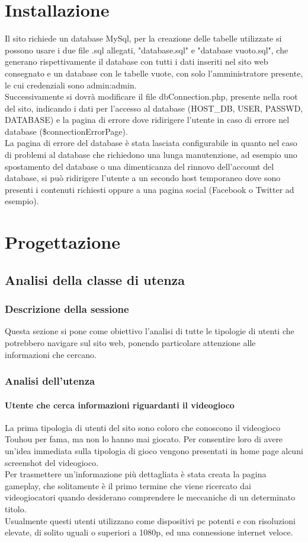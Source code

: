 \documentclass[openany, a4paper, 12pt]{report}
\begin{document}
	\chapter{Installazione}
	Il sito richiede un database MySql, per la creazione delle tabelle utilizzate si possono usare i due file .sql allegati, "database.sql" e "database vuoto.sql", che generano rispettivamente il database con tutti i dati inseriti nel sito web consegnato e un database con le tabelle vuote, con solo l'amministratore presente, le cui credenziali sono admin:admin.\\
	Successivamente si dovrà modificare il file dbConnection.php, presente nella root del sito, indicando i dati per l'accesso al database (HOST\_DB, USER, PASSWD, DATABASE) e la pagina di errore dove ridirigere l'utente in caso di errore nel database  (\$connectionErrorPage).\\
	La pagina di errore del database è stata lasciata configurabile in quanto nel caso di problemi al database che richiedono una lunga manutenzione, ad esempio uno spostamento del database o una dimenticanza del rinnovo dell'account del database, si può ridirigere l'utente a un secondo host temporaneo dove sono presenti i contenuti richiesti oppure a una pagina social (Facebook o Twitter ad esempio).

	\chapter{Progettazione}

	\section{Analisi della classe di utenza}

		\subsection{Descrizione della sessione}
		Questa sezione si pone come obiettivo l'analisi di tutte le tipologie di utenti che potrebbero navigare sul sito web, ponendo particolare attenzione alle informazioni che cercano.
		\subsection{Analisi dell'utenza}
		\subsubsection{Utente che cerca informazioni riguardanti il videogioco}
		La prima tipologia di utenti del sito sono coloro che conoscono il videogioco Touhou per fama, ma non lo hanno mai giocato. Per consentire loro di avere un'idea immediata sulla tipologia di gioco vengono presentati in home page alcuni screenshot del videogioco.\\
		Per trasmettere un'informazione più dettagliata è stata creata la pagina gameplay, che solitamente è il primo termine che viene ricercato dai videogiocatori quando desiderano comprendere le meccaniche di un determinato titolo.\\
		Usualmente questi utenti utilizzano come dispositivi pc potenti e con risoluzioni elevate, di solito uguali o superiori a 1080p, ed una connessione internet veloce.
\end{document}
